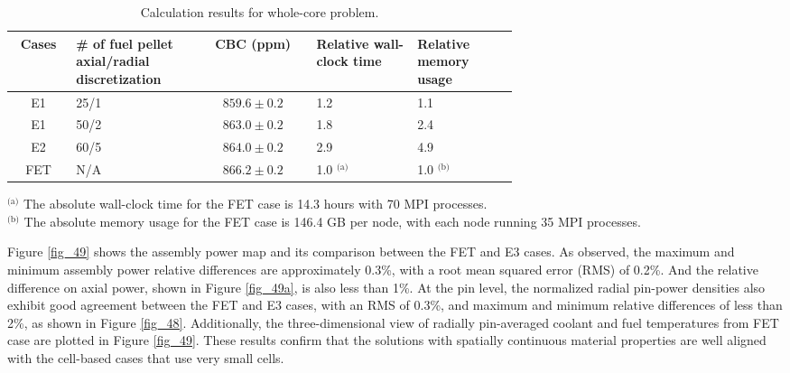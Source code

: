 \begin{table}
    \centering
    \caption{Calculation results for whole-core problem.}
    \label{tab33} 
        \begin{tabular}{| c | C{0.25\linewidth} | c | C{0.2\linewidth} | C{0.2\linewidth} | }
            \hline 
            Cases & \# of fuel pellet axial/radial discretization & CBC (ppm) & Relative wall-clock time & Relative memory usage \\
            \hline
            E1     & 25/1  & $859.6\pm0.2$ & 1.2 & 1.1      \\ \hline
            E1     & 50/2  & $863.0\pm0.2$ & 1.8 & 2.4      \\ \hline
            E2     & 60/5  & $864.0\pm0.2$ & 2.9 & 4.9      \\ \hline
            FET    & N/A   & $866.2\pm0.2$ & 1.0 $^\text{(a)}$ & 1.0 $^\text{(b)}$      \\ \hline
        \end{tabular}
    \begin{flushleft}
        \small
        $^\text{(a)}$ The absolute wall-clock time for the FET case is 14.3 hours with 70 MPI processes. \\
        $^\text{(b)}$ The absolute memory usage for the FET case is 146.4 GB per node, with each node running 35 MPI processes.
    \end{flushleft}
\end{table}

Figure \ref{fig_49} shows the assembly power map and its comparison between the FET and E3 cases. As observed, the maximum and minimum assembly power relative differences are approximately 0.3\%, with a root mean squared error (RMS) of 0.2\%. And the relative difference on axial power, shown in Figure \ref{fig_49a}, is also less than 1\%. At the pin level, the normalized radial pin-power densities also exhibit good agreement between the FET and E3 cases, with an RMS of 0.3\%, and maximum and minimum relative differences of less than 2\%, as shown in Figure \ref{fig_48}. Additionally, the three-dimensional view of radially pin-averaged coolant and  fuel temperatures from FET case are plotted in Figure \ref{fig_49}. These results confirm that the solutions with spatially continuous material properties are well aligned with the cell-based cases that use very small cells.

